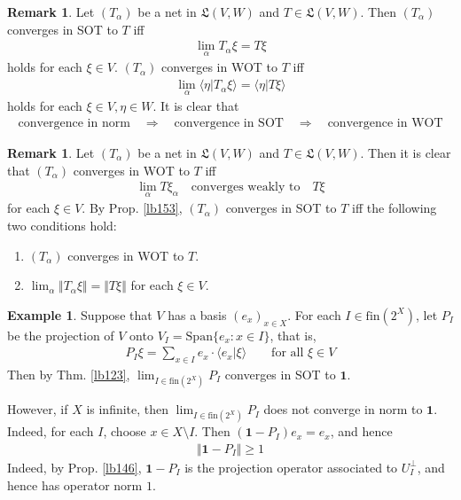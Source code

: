 \documentclass[12pt,b5paper,notitlepage]{article}
\theoremstyle{definition}
\newtheorem{eg}[df]{Example}
\newtheorem{rem}[df]{Remark}
\theoremstyle{plain}
\newcommand{\fk}{\mathfrak}
\newcommand{\idt}{\mathbf{1}}
\newcommand{\Span}{\mathrm{Span}}
\newcommand{\bk}[1]{\langle {#1}\rangle}
\newcommand{\fin}{\mathrm{fin}}
\newcommand{\hqed}{\hfill\qedsymbol}
\numberwithin{equation}{section}
\begin{document}
\begin{rem}
Let $(T_\alpha)$ be a net in $\fk L(V,W)$ and $T\in\fk L(V,W)$. Then $(T_\alpha)$ converges in SOT to $T$ iff
\begin{align}
\lim_\alpha T_\alpha\xi=T\xi
\end{align}
holds for each $\xi\in V$. $(T_\alpha)$ converges in WOT to $T$ iff
\begin{align}
\lim_\alpha \bk{\eta|T_\alpha\xi}=\bk{\eta|T\xi}
\end{align}
holds for each $\xi\in V,\eta\in W$. It is clear that
\begin{align*}
\text{convergence in norm}\quad\Rightarrow\quad\text{convergence in SOT}\quad\Rightarrow\quad\text{convergence in WOT}
\end{align*}
\end{rem}


\begin{rem}\label{lb241}
Let $(T_\alpha)$ be a net in $\fk L(V,W)$ and $T\in\fk L(V,W)$. Then it is clear that $(T_\alpha)$ converges in WOT to $T$ iff
\begin{align*}
\lim_\alpha T\xi_\alpha\quad\text{converges weakly to}\quad T\xi
\end{align*}
for each $\xi\in V$. By Prop. \ref{lb153}, $(T_\alpha)$ converges in SOT to $T$ iff the following two conditions hold:
\begin{enumerate}[label=(\arabic*)]
\item $(T_\alpha)$ converges in WOT to $T$.
\item $\lim_\alpha \Vert T_\alpha\xi\Vert=\Vert T\xi\Vert$ for each $\xi\in V$.
\end{enumerate}
\end{rem}


\begin{eg}\label{lb157}
Suppose that $V$ has a basis $(e_x)_{x\in X}$. For each $I\in\fin(2^X)$, let $P_I$ be the projection of $V$ onto $V_I=\Span\{e_x:x\in I\}$, that is,
\begin{align*}
P_I\xi=\sum_{x\in I}e_x\cdot\bk{e_x|\xi}\qquad\text{for all }\xi\in V
\end{align*}
Then by Thm. \ref{lb123}, $\lim_{I\in\fin(2^X)}P_I$ converges in SOT to $\idt$. 

However, if $X$ is infinite, then $\lim_{I\in\fin(2^X)}P_I$ does not converge in norm to $\idt$. Indeed, for each $I$, choose $x\in X\setminus I$. Then $(\idt-P_I)e_x=e_x$, and hence
\begin{align*}
\Vert\idt-P_I\Vert\geq 1
\end{align*}
Indeed, by Prop. \ref{lb146}, $\idt-P_I$ is the projection operator associated to $U_I^\perp$, and hence has operator norm $1$.  \hqed
\end{eg}
\end{document}
